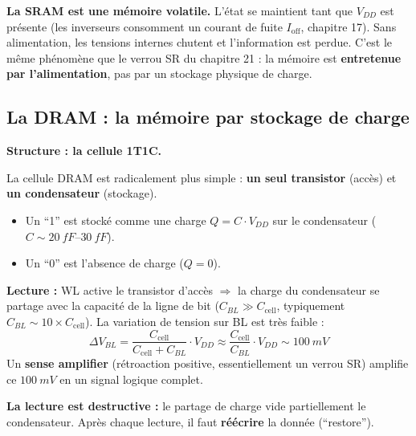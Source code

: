 \documentclass[12pt,a4paper,twoside]{book}
\begin{document}
\begin{attention}
\textbf{La SRAM est une mémoire volatile.} L'état se maintient tant que $V_{DD}$ est présente (les inverseurs consomment un courant de fuite $I_{\text{off}}$, chapitre 17). Sans alimentation, les tensions internes chutent et l'information est perdue. C'est le même phénomène que le verrou SR du chapitre 21 : la mémoire est \textbf{entretenue par l'alimentation}, pas par un stockage physique de charge.
\end{attention}

\subsection{La DRAM : la mémoire par stockage de charge}

\begin{formule}
\textbf{Structure : la cellule 1T1C.}

La cellule DRAM est radicalement plus simple : \textbf{un seul transistor} (accès) et \textbf{un condensateur} (stockage).

\begin{itemize}[nosep]
\item Un ``1'' est stocké comme une charge $Q = C \cdot V_{DD}$ sur le condensateur ($C \sim \SI{20}{fF}$--$\SI{30}{fF}$).
\item Un ``0'' est l'absence de charge ($Q = 0$).
\end{itemize}

\textbf{Lecture :} WL active le transistor d'accès $\Rightarrow$ la charge du condensateur se partage avec la capacité de la ligne de bit ($C_{BL} \gg C_{\text{cell}}$, typiquement $C_{BL} \sim 10\times C_{\text{cell}}$). La variation de tension sur BL est très faible :
\[
\Delta V_{BL} = \frac{C_{\text{cell}}}{C_{\text{cell}} + C_{BL}} \cdot V_{DD} \approx \frac{C_{\text{cell}}}{C_{BL}} \cdot V_{DD} \sim \SI{100}{mV}
\]
Un \textbf{sense amplifier} (rétroaction positive, essentiellement un verrou SR) amplifie ce $\SI{100}{mV}$ en un signal logique complet.

\textbf{La lecture est destructive :} le partage de charge vide partiellement le condensateur. Après chaque lecture, il faut \textbf{réécrire} la donnée (``restore'').
\end{formule}
\end{document}
